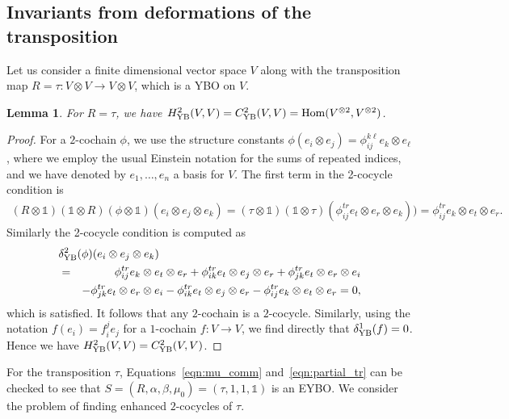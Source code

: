\documentclass[11pt,fleqn]{amsart} %
\newtheorem{lemma}[theorem]{Lemma}
\begin{document}
\subsection{Invariants from deformations of the transposition}
			Let us consider a finite dimensional vector space $V$ along with the transposition map $R=\tau : V\otimes V \rightarrow V\otimes V$, which is a YBO on $V$. 
						
\begin{lemma} 		For $R=\tau$, we have 	
$H^2_{\rm YB}(V, V) = C^2_{\rm YB}(V, V) = {\rm Hom} (V^{\otimes 2}, V^{\otimes 2})$.
\end{lemma}

\begin{proof}			For a $2$-cochain 
			$\phi$, 
			 we use the structure constants $\phi(e_i\otimes e_j) = \phi_{ij}^{k\ell}e_k\otimes e_\ell$, where we employ the usual Einstein notation for the sums of repeated indices, and we have denoted by $e_1, \ldots, e_n$ a basis for $V$. 
			The first term in the 2-cocycle condition is 
			\begin{eqnarray*}
				(R \otimes \mathbb 1) (\mathbb 1 \otimes R)(\phi \otimes \mathbb 1)(e_i \otimes e_j \otimes e_k)
				= (\tau  \otimes \mathbb 1) (\mathbb 1 \otimes \tau) ( \phi_{ij}^{tr} e_t \otimes e_r \otimes e_k) ) = 
				\phi_{ij}^{tr}  e_k \otimes e_t \otimes e_r.
			\end{eqnarray*}
					 Similarly the 2-cocycle condition is computed as 
			\begin{eqnarray*}
		\lefteqn{	\delta^2_{\rm YB}(\phi)(e_i \otimes e_j \otimes e_k ) }\\
		&=& 			\phi_{ij}^{tr} e_k\otimes e_t\otimes e_r + \phi_{ik}^{tr} e_t\otimes e_j\otimes e_r 
					+ \phi_{jk}^{tr} e_t\otimes e_r\otimes e_i \\ 
					& & - \phi_{jk}^{tr} e_t\otimes e_r\otimes e_i -  \phi_{ik}^{tr} e_t\otimes e_j\otimes e_r  - \phi_{ij}^{tr} e_k\otimes e_t\otimes e_r =0 , 
			\end{eqnarray*} 
			which is 
			satisfied. It follows that any $2$-cochain is a $2$-cocycle. Similarly, using the notation $f(e_i) = f_i^je_j$ for a $1$-cochain $f:V\rightarrow V$, we find directly that $\delta^1_{\rm YB}(f) = 0$. 
			Hence we have $H^2_{\rm YB}(V, V) = C^2_{\rm YB}(V, V)$. 
\end{proof}
			
			
For the transposition $\tau$, Equations~\eqref{eqn:mu_comm} and~\eqref{eqn:partial_tr}  can be checked 
			to see that $S=(R,\alpha, \beta, \mu_0)= (\tau, 1, 1, \mathbb 1)$ is an EYBO.
		We consider the problem of finding enhanced $2$-cocycles of $\tau$. 
			
\end{document}
